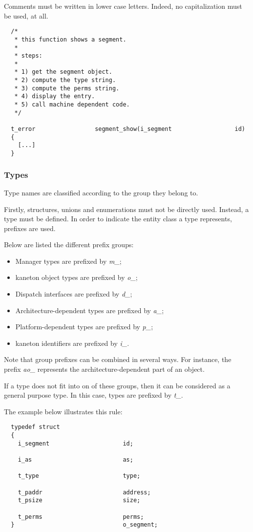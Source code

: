 Comments must be written in lower case letters. Indeed, no capitalization
must be used, at all.

\begin{verbatim}
  /*
   * this function shows a segment.
   *
   * steps:
   *
   * 1) get the segment object.
   * 2) compute the type string.
   * 3) compute the perms string.
   * 4) display the entry.
   * 5) call machine dependent code.
   */

  t_error                 segment_show(i_segment                  id)
  {
    [...]
  }
\end{verbatim}


\subsubsection{Types}

Type names are classified according to the group they belong to.

Firstly, structures, unions and enumerations must not be directly used.
Instead, a type must be defined. In order to indicate the entity class a type
represents, prefixes are used.

Below are listed the different prefix groups:

\begin{itemize}
  \item
    Manager types are prefixed by \textit{m\_};
  \item
    kaneton object types are prefixed by \textit{o\_};
  \item
    Dispatch interfaces are prefixed by \textit{d\_};
  \item
    Architecture-dependent types are prefixed by \textit{a\_};
  \item
    Platform-dependent types are prefixed by \textit{p\_};
  \item
    kaneton identifiers are prefixed by \textit{i\_}.
\end{itemize}

Note that group prefixes can be combined in several ways. For instance,
the prefix \textit{ao\_} represents the architecture-dependent part of
an object.

If a type does not fit into on of these groups, then it can be considered as a
general purpose type. In this case, types are prefixed by \textit{t\_}.

The example below illustrates this rule:

\begin{verbatim}
  typedef struct
  {
    i_segment                     id;

    i_as                          as;

    t_type                        type;

    t_paddr                       address;
    t_psize                       size;

    t_perms                       perms;
  }                               o_segment;
\end{verbatim}

